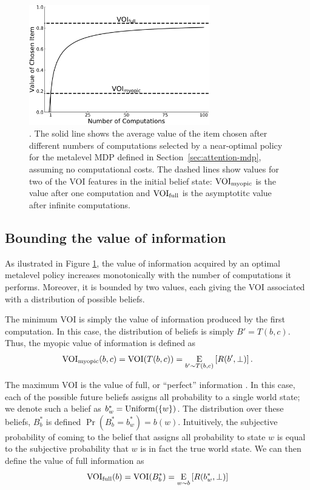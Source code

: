\begin{figure}[b!]
  \centering
  \includegraphics[width=0.7\textwidth]{figs/attention/supp-voi-vpi.pdf}
  \caption{.
    The solid line shows the average value of the item chosen after different numbers of computations selected by a near-optimal policy for the metalevel MDP defined in Section~\ref{sec:attention-mdp}, assuming no computational costs. The dashed lines show values for two of the VOI features in the initial belief state: $\VOImy$ is the value after one computation and $\VPI$ is the asymptotitc value after infinite computations.
  }
  \label{fig:bmps-voi}
\end{figure}

\subsection{Bounding the value of information}

As ilustrated in Figure \ref{fig:bmps-voi}, the value of information acquired by an optimal metalevel policy increases monotonically with the number of computations it performs. Moreover, it is bounded by two values, each giving the VOI associated with a distribution of possible beliefs.

The minimum VOI is simply the value of information produced by the first computation. In this case, the distribution of beliefs is simply $B' = T(b, c)$. Thus, the myopic value of information is defined as
\begin{equation*}
  \VOImy(b,c) =  \VOI(T(b, c)) = \expectunder{R(b', \bot)}{b' \sim T(b, c)}.
\end{equation*}

The maximum VOI is the value of full, or ``perfect'' information \citep{howard1966information}. In this case, each of the possible future beliefs assigns all probability to a single world state; we denote such a belief as $b^*_w = \Uniform(\{w\})$.
The distribution over these beliefs, $B^*_b$ is defined $\Pr(B^*_b = b^*_w ) = b(w)$. Intuitively, the subjective probability of coming to the belief that assigns all probability to state $w$ is equal to the subjective probability that $w$ is in fact the true world state. We can then define the value of full information as
\begin{equation}
  \VPI(b) = \VOI(B^*_b) = \expectunder{R(b^*_w, \bot)}{w \sim b}
\end{equation}


